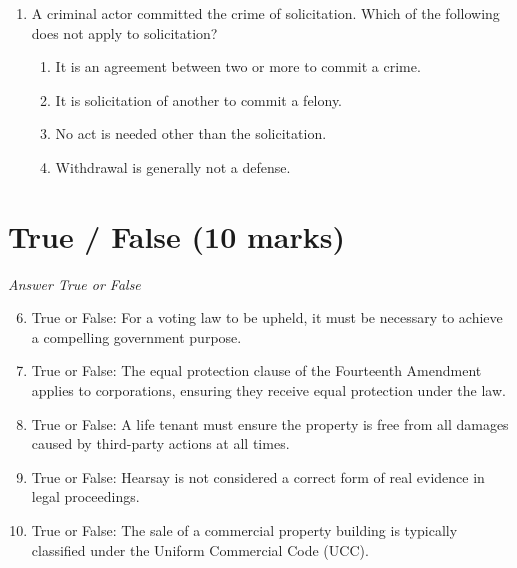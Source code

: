 \documentclass[12pt]{article}
\begin{document}
\begin{enumerate}[label=\arabic*.]
\begin{enumerate}[label=(\alph*)]
    \item interpretation of treaties
    \item interpretation of admiralty laws
    \item disputes between states and foreign citizens
    \item all of the above
\end{enumerate}
\item A criminal actor committed the crime of solicitation. Which of the following does not apply to solicitation?
\begin{enumerate}[label=(\alph*)]
    \item It is an agreement between two or more to commit a crime.
    \item It is solicitation of another to commit a felony.
    \item No act is needed other than the solicitation.
    \item Withdrawal is generally not a defense.
\end{enumerate}
\end{enumerate}

\section*{True / False (10 marks)}
\textit{Answer True or False}
\begin{enumerate}[label=\arabic*.]
\setcounter{enumi}{5}
\item True or False: For a voting law to be upheld, it must be necessary to achieve a compelling government purpose.
\item True or False: The equal protection clause of the Fourteenth Amendment applies to corporations, ensuring they receive equal protection under the law.
\item True or False: A life tenant must ensure the property is free from all damages caused by third-party actions at all times.
\item True or False: Hearsay is not considered a correct form of real evidence in legal proceedings.
\item True or False: The sale of a commercial property building is typically classified under the Uniform Commercial Code (UCC).
\end{enumerate}
\end{document}
